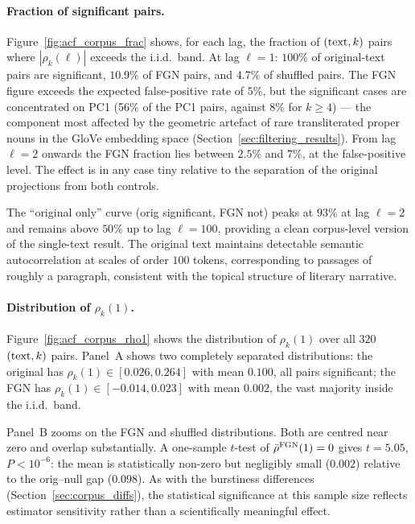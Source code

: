 \documentclass[12pt,a4paper]{article}
\begin{document}
\paragraph{Fraction of significant pairs.}
Figure~\ref{fig:acf_corpus_frac} shows, for each lag, the fraction of
$({\rm text}, k)$ pairs where $|\rho_k(\ell)|$ exceeds the i.i.d.\
band.
At lag $\ell = 1$: $100\%$ of original-text pairs are significant,
$10.9\%$ of FGN pairs, and $4.7\%$ of shuffled pairs.
The FGN figure exceeds the expected false-positive rate
of $5\%$, but the significant cases are concentrated on PC1
(56\% of the PC1 pairs, against 8\% for $k \geq 4$) --- the component
most affected by the geometric artefact of rare transliterated proper
nouns in the GloVe embedding space (Section~\ref{sec:filtering_results}).
From lag $\ell = 2$ onwards the FGN fraction lies between $2.5\%$ and
$7\%$, at the false-positive level. The effect is in any case tiny
relative to the separation of the original projections from both
controls.

The ``original only'' curve (orig significant, FGN not) peaks at
$93\%$ at lag $\ell = 2$ and remains above $50\%$ up to lag
$\ell = 100$, providing a clean corpus-level version of the
single-text result.
The original text maintains detectable semantic autocorrelation
at scales of order $100$ tokens, corresponding to passages of
roughly a paragraph, consistent with the topical structure of
literary narrative.

\paragraph{Distribution of $\rho_k(1)$.}
Figure~\ref{fig:acf_corpus_rho1} shows the distribution of
$\rho_k(1)$ over all $320$ $({\rm text}, k)$ pairs.
Panel~A shows two completely separated distributions: the original
has $\rho_k(1) \in [0.026, 0.264]$ with mean $0.100$, all
pairs significant; the FGN has $\rho_k(1) \in [-0.014, 0.023]$
with mean $0.002$, the vast majority inside the i.i.d.\ band.

Panel~B zooms on the FGN and shuffled distributions.
Both are centred near zero and overlap substantially.
A one-sample $t$-test of $\bar\rho^{\rm FGN}(1) = 0$ gives
$t = 5.05$, $P < 10^{-6}$: the mean is statistically non-zero but
negligibly small ($0.002$) relative to the orig--null gap ($0.098$).
As with the burstiness differences (Section~\ref{sec:corpus_diffs}),
the statistical significance at this sample size reflects estimator
sensitivity rather than a scientifically meaningful effect.
\end{document}
